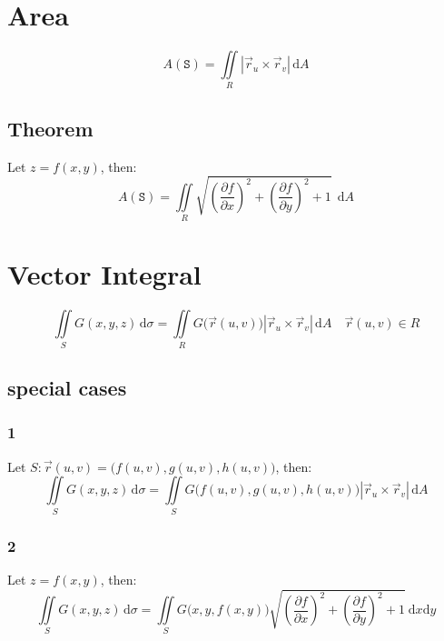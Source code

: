 \documentclass[12pt, fleqn]{book}
\begin{document}
	\section{Area}
		\begin{equation}
			A(\mathtt{S}) = \iint\limits_R \left|\vec{r}_u \times \vec{r}_v\right| \, \mathrm{d}A
		\end{equation}
		\subsection{Theorem}
			Let $z = f(x, y)$, then:
			\begin{equation}
				A(\mathtt{S}) = 
				  \iint\limits_R 
				  \sqrt{
				  	(\frac{\partial f}{\partial x})^2 + 
				  	(\frac{\partial f}{\partial y})^2 + 
				  	1
			  	} 
				  \ \ \mathrm{d}A
			\end{equation}
	\section{Vector Integral}
		\begin{equation}
			\iint\limits_S G(x, y, z) \, \mathrm{d}\sigma 
			  = \iint\limits_R G\big(\vec{r}(u, v)\big) 
			    \left|\vec{r}_u \times \vec{r}_v\right| 
			    \, \mathrm{d}A 
			    \quad \vec{r}(u, v) \in R
		\end{equation}
		\subsection{special cases}
			\subsubsection{1}
				Let $S: \vec{r}(u, v) = \big(f(u, v), g(u, v), h(u, v)\big)$, then:
			 	\begin{equation}
			 		\iint\limits_S G(x, y, z) \, \mathrm{d}\sigma
			 		  = \iint\limits_S G\big(f(u, v), g(u, v), h(u, v)\big) 
			 		    \left|\vec{r}_u \times \vec{r}_v\right| 
			 		    \, \mathrm{d}A
			 	\end{equation}
		 	\subsubsection{2}
		 		Let $z = f(x, y)$, then:
		 		\begin{equation}
		 			\iint\limits_S G(x, y, z) \, \mathrm{d}\sigma
		 			  = \iint\limits_S G\big(x, y, f(x, y)\big)
		 			  \sqrt{
		 			  	(\frac{\partial f}{\partial x})^2 + 
		 			  	(\frac{\partial f}{\partial y})^2 + 
		 			  	1
	 			  	  } 
 			  	       \ \mathrm{d}x \mathrm{d}y
		 		\end{equation}
\end{document}
